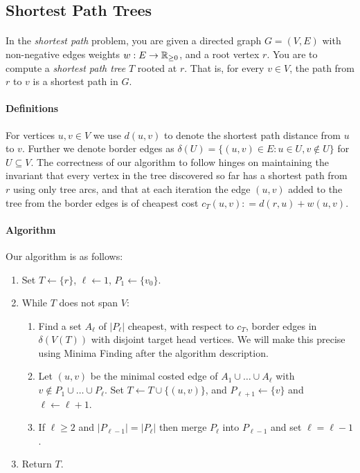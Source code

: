 \subsection{Shortest Path Trees}
\paragraph{}
In the {\it shortest path} problem, you are given a directed graph $G=(V,E)$ with non-negative edges weights $w: E\rightarrow \mathbb{R}_{\geq 0}$, and a root vertex $r$. You are to compute a {\it shortest path tree} $T$ rooted at $r$. That is, for every $v \in V$, the path from $r$ to $v$ is a shortest path in $G$.
\paragraph{Definitions}
For vertices $u, v \in V$ we use $d(u,v)$ to denote the shortest path distance from $u$ to $v$. Further we denote border edges as $\delta(U) = \{(u,v ) \in E: u \in U, v\not\in U\}$ for $U \subseteq V$. The correctness of our algorithm to follow hinges on maintaining the invariant that every vertex in the tree discovered so far has a shortest path from $r$ using only tree arcs, and that at each iteration the edge $(u,v)$ added to the tree from the border edges is of cheapest cost $c_T(u,v) : = d(r,u) + w(u,v)$.
\paragraph{Algorithm}
Our algorithm is as follows:
\begin{enumerate}
\item Set $T \leftarrow \{r\}$, $\ell \leftarrow 1$, $P_1 \leftarrow \{v_0\}$.
\item While $T$ does not span $V$:
	\begin{enumerate}
	\item Find a set $A_\ell$ of $|P_\ell|$ cheapest, with respect to $c_T$, border edges in $\delta(V(T))$ with disjoint target head vertices. We will make this precise using Minima Finding after the algorithm description.
	\item Let $(u,v)$ be the minimal costed edge of $A_1 \cup \dots \cup A_\ell$ with $v\not\in P_1 \cup \dots \cup P_\ell$. Set $T \leftarrow T \cup \{(u,v)\}$, and $P_{\ell + 1} \leftarrow \{v\}$ and $\ell \leftarrow \ell + 1$.
	\item If $\ell \geq 2$ and $|P_{\ell -1}| = |P_{\ell}|$ then merge $P_\ell$ into $P_{\ell -1}$ and set $\ell = \ell -1$.
	\end{enumerate}
\item Return $T$.
\end{enumerate}
